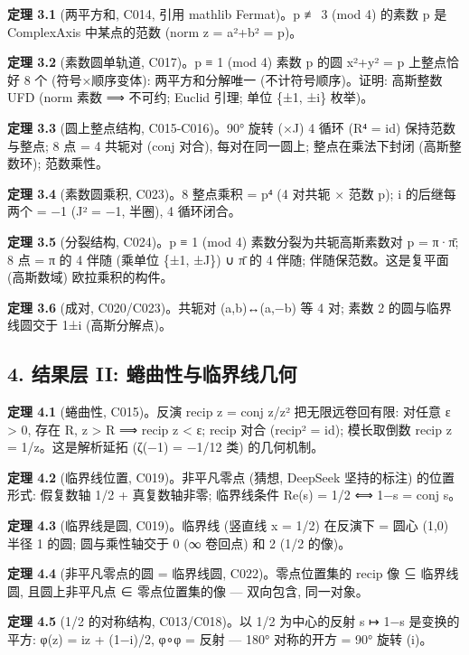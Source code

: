 \documentclass[
]{article}
\begin{document}
\textbf{定理 3.1} (两平方和, C014, 引用 mathlib Fermat)。p ≢ 3 (mod 4)
的素数 p 是 ComplexAxis 中某点的范数 (norm z = a²+b² = p)。

\textbf{定理 3.2} (素数圆单轨道, C017)。p ≡ 1 (mod 4) 素数 p 的圆 x²+y²
= p 上整点恰好 8 个 (符号×顺序变体): 两平方和分解唯一
(不计符号顺序)。证明: 高斯整数 UFD (norm 素数 ⟹ 不可约; Euclid 引理;
单位 \{±1, ±i\} 枚举)。

\textbf{定理 3.3} (圆上整点结构, C015-C016)。90° 旋转 (×J) 4 循环 (R⁴ =
id) 保持范数与整点; 8 点 = 4 共轭对 (conj 对合), 每对在同一圆上;
整点在乘法下封闭 (高斯整数环); 范数乘性。

\textbf{定理 3.4} (素数圆乘积, C023)。8 整点乘积 = p⁴ (4 对共轭 × 范数
p); i 的后继每两个 = −1 (J² = −1, 半圈), 4 循环闭合。

\textbf{定理 3.5} (分裂结构, C024)。p ≡ 1 (mod 4)
素数分裂为共轭高斯素数对 p = π·π̄; 8 点 = π 的 4 伴随 (乘单位 \{±1, ±J\})
∪ π̄ 的 4 伴随; 伴随保范数。这是复平面 (高斯数域) 欧拉乘积的构件。

\textbf{定理 3.6} (成对, C020/C023)。共轭对 (a,b)↔(a,−b) 等 4 对; 素数 2
的圆与临界线圆交于 1±i (高斯分解点)。

\subsection{4. 结果层 II:
蜷曲性与临界线几何}\label{ux7ed3ux679cux5c42-ii-ux8737ux66f2ux6027ux4e0eux4e34ux754cux7ebfux51e0ux4f55}

\textbf{定理 4.1} (蜷曲性, C015)。反演 recip z = conj
z/\textbar z\textbar² 把无限远卷回有限: 对任意 ε \textgreater{} 0, 存在
R, \textbar z\textbar{} \textgreater{} R ⟹ \textbar recip z\textbar{}
\textless{} ε; recip 对合 (recip² = id); 模长取倒数 \textbar recip
z\textbar{} = 1/\textbar z\textbar。这是解析延拓 (ζ(−1) = −1/12 类)
的几何机制。

\textbf{定理 4.2} (临界线位置, C019)。非平凡零点 (猜想, DeepSeek
坚持的标注) 的位置形式: 假复数轴 1/2 + 真复数轴非零; 临界线条件 Re(s) =
1/2 ⟺ 1−s = conj s。

\textbf{定理 4.3} (临界线是圆, C019)。临界线 (竖直线 x = 1/2) 在反演下 =
圆心 (1,0) 半径 1 的圆; 圆与乘性轴交于 0 (∞ 卷回点) 和 2 (1/2 的像)。

\textbf{定理 4.4} (非平凡零点的圆 = 临界线圆, C022)。零点位置集的 recip
像 ⊆ 临界线圆, 且圆上非平凡点 ∈ 零点位置集的像 --- 双向包含, 同一对象。

\textbf{定理 4.5} (1/2 的对称结构, C013/C018)。以 1/2 为中心的反射 s ↦
1−s 是变换的平方: φ(z) = iz + (1−i)/2, φ∘φ = 反射 --- 180° 对称的开方 =
90° 旋转 (i)。
\end{document}
